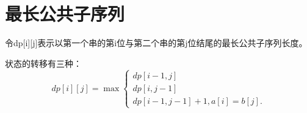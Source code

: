 \documentclass{article}
\begin{document}
\section{最长公共子序列}
令dp[i][j]表示以第一个串的第i位与第二个串的第j位结尾的最长公共子序列长度。

状态的转移有三种：
\begin{equation*}
    dp[i][j]=\max
    \begin{cases}
        dp[i-1,j]\\
        dp[i,j-1]\\
        dp[i-1,j-1]+1,a[i]=b[j].
    \end{cases}
\end{equation*}
\end{document}
